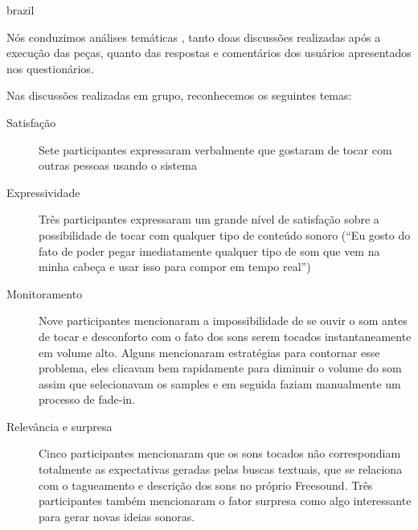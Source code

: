 \begin{otherlanguage*}{brazil}
 

Nós conduzimos análises temáticas \cite{Braun2006}, tanto doas discussões realizadas após a execução das peças, quanto das respostas e comentários dos usuários apresentados nos questionários. 

Nas discussões realizadas em grupo, reconhecemos os seguintes temas:

\begin{description}
 \item[Satisfação] Sete participantes expressaram verbalmente que gostaram de tocar com outras pessoas usando o sistema

  \item[Expressividade] Três participantes expressaram um grande nível de satisfação sobre a possibilidade de tocar com qualquer tipo de conteúdo sonoro (``Eu gosto do fato de poder pegar imediatamente qualquer tipo de som que vem na minha cabeça e usar isso para compor em tempo real'')

 \item[Monitoramento] Nove participantes mencionaram a impossibilidade de se ouvir o som antes de tocar e desconforto com o fato dos sons serem tocados instantaneamente em volume alto. Alguns mencionaram estratégias para contornar esse problema, eles clicavam bem rapidamente para diminuir o volume do som assim que selecionavam os samples e em seguida faziam manualmente um processo de fade-in.

 \item[Relevância e surpresa] Cinco participantes mencionaram que os sons tocados não correspondiam totalmente as expectativas geradas pelas buscas textuais, que se relaciona com o tagueamento e descrição dos sons no próprio Freesound. Três participantes também mencionaram o fator surpresa como algo interessante para gerar novas ideias sonoras.


\end{description}
\end{otherlanguage*}
